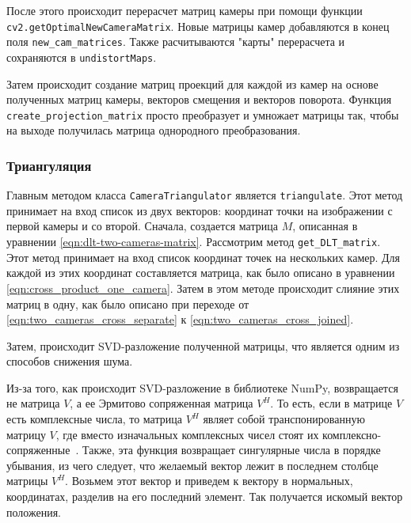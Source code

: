 \documentclass[12pt, a4paper]{article}
\begin{document}
После этого происходит перерасчет матриц камеры при помощи функции
\texttt{cv2.getOptimalNewCameraMatrix}. Новые матрицы камер добавляются в конец
поля \texttt{new\_cam\_matrices}. Также расчитываются "карты" перерасчета и
сохраняются в \texttt{undistortMaps}.

Затем происходит создание матриц проекций для каждой из камер на основе
полученных матриц камеры, векторов смещения и векторов поворота.
Функция \texttt{create\_projection\_matrix} просто преобразует и умножает
матрицы так, чтобы на выходе получилась матрица однородного преобразования.

\subsubsection{Триангуляция}
Главным методом класса \texttt{CameraTriangulator} является \texttt{triangulate}.
Этот метод принимает на вход список из двух векторов: координат точки на
изображении с первой камеры и со второй.
Сначала, создается матрица $M$, описанная в уравнении
\eqref{eqn:dlt-two-cameras-matrix}. 
Рассмотрим метод \texttt{get\_DLT\_matrix}. Этот метод принимает на вход список
координат точек на нескольких камер. Для каждой из этих координат составляется
матрица, как было описано в уравнении \eqref{eqn:cross_product_one_camera}.
Затем в этом методе происходит слияние этих матриц в одну, как было описано при
переходе от \eqref{eqn:two_cameras_cross_separate} к
\eqref{eqn:two_cameras_cross_joined}.

Затем, происходит SVD-разложение полученной матрицы, что является одним из
способов снижения шума.

Из-за того, как происходит SVD-разложение в библиотеке NumPy, возвращается не
матрица $V$, а ее Эрмитово сопряженная матрица $V^H$. То есть, если в матрице
$V$ есть комплексные числа, то матрица $V^H$ являет собой транспонированную
матрицу $V$, где вместо изначальных комплексных чисел стоят их
комплексно-сопряженные~\cite{numpy_svd}. Также, эта функция возвращает
сингулярные числа в порядке убывания, из чего следует, что желаемый вектор
лежит в последнем столбце матрицы $V^H$. Возьмем этот вектор и приведем к вектору в
нормальных, координатах, разделив на его последний элемент. Так получается
искомый вектор положения.
\end{document}
